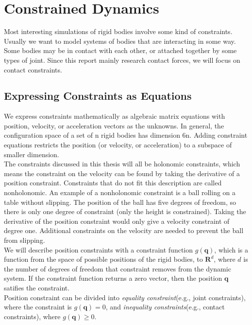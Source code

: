 \section{Constrained Dynamics}
    Most interesting simulations of rigid bodies involve some kind of constraints. Usually we want to model systems of bodies that are interacting in some way. Some bodies may be in contact with each other, or attached together by some types of joint. Since this report mainly research contact forces, we will focus on contact constraints.
    \subsection{Expressing Constraints as Equations}
        We express constraints mathematically as algebraic matrix equations with position, velocity, or acceleration vectors as the unknowns. In general, the configuration space of a set of n rigid bodies has dimension 6n. Adding constraint equations restricts the position (or velocity, or acceleration) to a subspace of smaller dimension.\\

        The constraints discussed in this thesis will all be holonomic constraints, which means the constraint on the velocity can be found by taking the derivative of a position constraint. Constraints that do not fit this description are called nonholonomic. An example of a nonholonomic constraint is a ball rolling on a table without slipping. The position of the ball has five degrees of freedom, so there is only one degree of constraint (only the height is constrained). Taking the derivative of the position constraint would only give a velocity constraint of degree one. Additional constraints on the velocity are needed to prevent the ball from slipping.\\

        We will describe position constraints with a constraint function $g(\pmb{q})$, which is a function from the space of possible positions of the rigid bodies, to $\mathbf{R}^d$, where $d$ is the number of degrees of freedom that constraint removes from the dynamic system. If the constraint function returns a zero vector, then the position $\pmb{q}$ satifies the constraint. \\

        Position constraint can be divided into \textit{equality constraint}(e.g., joint constraints), where the constraint is $g(\pmb{q}) = 0$, and \textit{inequality constraints}(e.g., contact constraints), where $g(\pmb{q}) \ge 0$. \\

